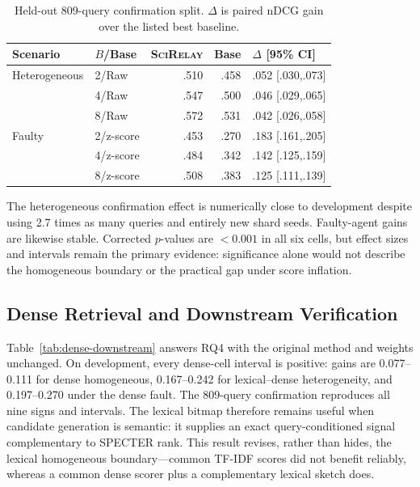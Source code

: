 \documentclass[sigconf]{acmart}
\newcommand{\method}{\textsc{SciRelay}}
\newcommand{\ndcg}{nDCG}
\begin{document}
\begin{table}[t]
\caption{Held-out 809-query confirmation split. $\Delta$ is paired \ndcg{} gain over the listed best baseline.}
\label{tab:confirmation}
\scriptsize
\setlength{\tabcolsep}{2.6pt}
\begin{tabular}{llrrl}
\toprule
Scenario & $B$/Base & \method{} & Base & $\Delta$ [95\% CI] \\
\midrule
Heterogeneous & 2/Raw & .510 & .458 & .052 [.030,.073] \\
 & 4/Raw & .547 & .500 & .046 [.029,.065] \\
 & 8/Raw & .572 & .531 & .042 [.026,.058] \\
Faulty & 2/z-score & .453 & .270 & .183 [.161,.205] \\
 & 4/z-score & .484 & .342 & .142 [.125,.159] \\
 & 8/z-score & .508 & .383 & .125 [.111,.139] \\
\bottomrule
\end{tabular}
\end{table}

The heterogeneous confirmation effect is numerically close to development despite using 2.7 times as many queries and entirely new shard seeds. Faulty-agent gains are likewise stable. Corrected $p$-values are $<0.001$ in all six cells, but effect sizes and intervals remain the primary evidence: significance alone would not describe the homogeneous boundary or the practical gap under score inflation.

\subsection{Dense Retrieval and Downstream Verification}

Table~\ref{tab:dense-downstream} answers RQ4 with the original method and weights unchanged. On development, every dense-cell interval is positive: gains are 0.077--0.111 for dense homogeneous, 0.167--0.242 for lexical--dense heterogeneity, and 0.197--0.270 under the dense fault. The 809-query confirmation reproduces all nine signs and intervals. The lexical bitmap therefore remains useful when candidate generation is semantic: it supplies an exact query-conditioned signal complementary to SPECTER rank. This result revises, rather than hides, the lexical homogeneous boundary---common TF-IDF scores did not benefit reliably, whereas a common dense scorer plus a complementary lexical sketch does.
\end{document}
